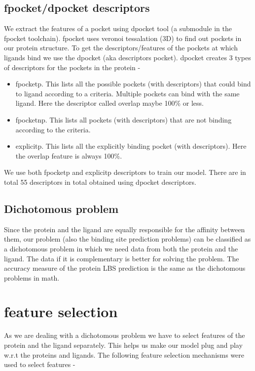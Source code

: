 \documentclass[11pt]{article}
\begin{document}
\subsection{fpocket/dpocket descriptors}
We extract the features of a pocket using dpocket tool (a submodule in the fpocket toolchain).
fpocket uses veronoi tessalation (3D) to find out pockets in our protein structure.
To get the descriptors/features of the pockets at which ligands bind we use the dpocket (aka descriptors pocket).
dpocket creates 3 types of descriptors for the pockets in the protein -
\begin{itemize}
\item fpocketp.  This lists all the possible pockets (with descriptors) that could bind to ligand according to a criteria.
Multiple pockets can bind with the same ligand.
Here the descriptor called overlap maybe 100\% or less.
\item fpocketnp.  This lists all pockets (with descriptors) that are not binding according to the criteria.
\item explicitp.
This lists all the explicitly binding pocket (with descriptors).
Here the overlap feature is always 100\%.
\end{itemize}

We use both fpocketp and explicitp descriptors to train our model.
There are in total 55 descriptors in total obtained using dpocket descriptors.


\subsection{Dichotomous problem}
Since the protein and the ligand are equally responsible for the affinity between them, our problem (also the binding site prediction problems) can be classified as a dichotomous problem in which we need data from both
the protein and the ligand.
The data if it is complementary is better for solving the problem.
The accuracy measure of the protein LBS prediction is the same as the dichotomous problems in math.

\section{feature selection}
As we are dealing with a dichotomous problem we have to select features of the protein and the ligand separately.
This helps us make our model plug and play w.r.t the proteins and ligands.
The following feature selection mechanisms were used to select features -
\end{document}
